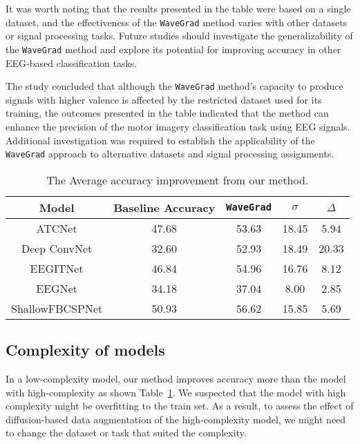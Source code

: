 It was worth noting that the results presented in the table were based on a single dataset, and the effectiveness of the \texttt{WaveGrad} method varies with other datasets or signal processing tasks. 
Future studies should investigate the generalizability of the \texttt{WaveGrad} method and explore its potential for improving accuracy in other EEG-based classification tasks.

The study concluded that although the \texttt{WaveGrad} method's capacity to produce signals with higher valence is affected by the restricted dataset used for its training, the outcomes presented in the table indicated that the method can enhance the precision of the motor imagery classification task using EEG signals. 
Additional investigation was required to establish the applicability of the \texttt{WaveGrad} approach to alternative datasets and signal processing assignments.


\begin{table}[ht!]
    \centering
    \caption{The Average accuracy improvement from our method.}
    \label{table: The Average accuracy improvement from our method}
    \begin{tabular}{ccccc}
        \hline
        Model           & Baseline Accuracy & \texttt{WaveGrad} & \begin{math} \sigma \end{math} & \begin{math} \Delta \end{math} \\
        \hline
        ATCNet          & 47.68             & 53.63    & 18.45                        & 5.94  \\
        Deep ConvNet    & 32.60             & 52.93    & 18.49                        & 20.33 \\
        EEGITNet        & 46.84             & 54.96    & 16.76                        & 8.12  \\
        EEGNet          & 34.18             & 37.04    & 8.00                         & 2.85  \\
        ShallowFBCSPNet & 50.93             & 56.62    & 15.85                        & 5.69 \\
        \hline
        \end{tabular}
\end{table}

\subsection{Complexity of models}
In a low-complexity model, our method improves accuracy more than the model with high-complexity as shown Table~\ref{table: The Average accuracy improvement from our method}.
We suspected that the model with high complexity might be overfitting to the train set.
As a result, to assess the effect of diffusion-based data augmentation of the high-complexity model, we might need to change the dataset or task that suited the complexity.

